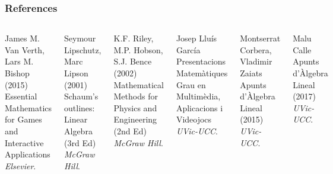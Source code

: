 \documentclass{beamer}
\begin{document}
\begin{frame}
\frametitle{References}

\footnotesize{
\begin{thebibliography}{99} %

\begin{columns}[t]

 James M. Van Verth, Lars M. Bishop (2015)
\newblock Essential Mathematics for Games and Interactive Applications
\newblock \emph{Elsevier}.

 Seymour Lipschutz, Marc Lipson (2001)
\newblock Schaum's outlines: Linear Algebra (3rd Ed)
\newblock \emph{McGraw Hill}.


 K.F. Riley, M.P. Hobson, S.J. Bence (2002)
\newblock Mathematical Methods for Physics and Engineering (2nd Ed)
\newblock \emph{McGraw Hill}.

 Josep Lluís García
\newblock Presentacions Matemàtiques Grau en Multimèdia, Aplicacions i Videojocs
\newblock \emph{UVic-UCC}.

 Montserrat Corbera, Vladimir Zaiats
\newblock Apunts d'Àlgebra Lineal (2015)
\newblock \emph{UVic-UCC}.

 Malu Calle
\newblock Apunts d'Àlgebra Lineal (2017)
\newblock \emph{UVic-UCC}.

\end{columns}
\end{thebibliography}

}
\end{frame}
\end{document}
